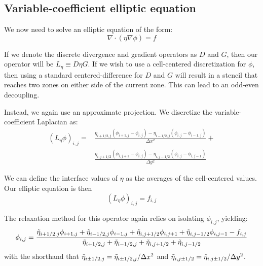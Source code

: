 \subsection{Variable-coefficient elliptic equation}

\label{sec:lm:vcelliptic}

We now need to solve an elliptic equation of the form:
\begin{equation}
\nabla \cdot (\eta \nabla \phi) = f
\end{equation}

If we denote the discrete divergence and gradient operators as $D$ and $G$,
then our operator will be $L_\eta \equiv D \eta G$.  If we wish to
use a cell-centered discretization for $\phi$, then using a standard 
centered-difference for $D$ and $G$ will result in a stencil that reaches
two zones on either side of the current zone.  This can lead to an
odd-even decoupling. 


Instead, we again use an approximate projection.  We discretize the
variable-coefficient Laplacian as:
\begin{align}
(L_\eta \phi)_{i,j} = 
 & \frac{\eta_{i+1/2,j} (\phi_{i+1,j} - \phi_{i,j}) -
        \eta_{i-1/2,j} (\phi_{i,j} - \phi_{i-1,j})}{\Delta x^2} + \nonumber \\
 & \frac{\eta_{i,j+1/2} (\phi_{i,j+1} - \phi_{i,j}) -
        \eta_{i,j-1/2} (\phi_{i,j} - \phi_{i,j-1})}{\Delta y^2}
\label{lm:eq:lap}
\end{align}

We can define the interface values of $\eta$ as the averages of the
cell-centered values.  Our elliptic equation is then 
\begin{equation}
(L_\eta \phi)_{i,j} = f_{i,j}
\end{equation}

The relaxation method for this operator again relies on isolating
$\phi_{i,j}$, yielding:
\begin{equation}
\phi_{i,j} = \frac{\tilde{\eta}_{i+1/2,j}\phi_{i+1,j} + \tilde{\eta}_{i-1/2,j}\phi_{i-1,j} +
                   \tilde{\eta}_{i,j+1/2}\phi_{i,j+1} + \tilde{\eta}_{i,j-1/2}\phi_{i,j-1} -
                   f_{i,j} } 
                  {\tilde{\eta}_{i+1/2,j} + \tilde{\eta}_{i-1/2,j} + 
                   \tilde{\eta}_{i,j+1/2} + \tilde{\eta}_{i,j-1/2}}
\label{lm:eq:smooth}
\end{equation}
with the shorthand that $\tilde{\eta}_{i\pm1/2,j} = \tilde{\eta}_{i\pm1/2,j}/\Delta x^2$
and $\tilde{\eta}_{i,j\pm1/2} = \tilde{\eta}_{i,j\pm1/2}/\Delta y^2$.

